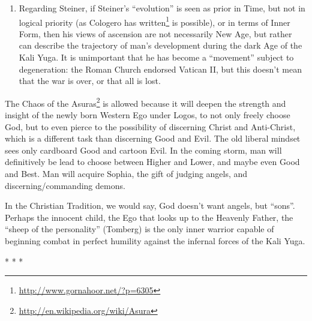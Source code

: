 \begin{enumerate}
\item Regarding Steiner, if Steiner's ``evolution'' is seen as prior in Time, but not in logical priority (as Cologero has written\footnote{\url{http://www.gornahoor.net/?p=6305}} is possible), or in terms of Inner Form, then his views of ascension are not necessarily New Age, but rather can describe the trajectory of man's development during the dark Age of the Kali Yuga. It is unimportant that he has become a ``movement'' subject to degeneration: the Roman Church endorsed Vatican II, but this doesn't mean that the war is over, or that all is lost.
\end{enumerate}

The Chaos of the Asuras\footnote{\url{http://en.wikipedia.org/wiki/Asura}} is allowed because it will deepen the strength and insight of the newly born Western Ego under Logos, to not only freely choose God, but to even pierce to the possibility of discerning Christ and Anti-Christ, which is a different task than discerning Good and Evil. The old liberal mindset sees only cardboard Good and cartoon Evil. In the coming storm, man will definitively be lead to choose between Higher and Lower, and maybe even Good and Best. Man will acquire Sophia, the gift of judging angels, and discerning/commanding demons.

In the Christian Tradition, we would say, God doesn't want angels, but ``sons''. Perhaps the innocent child, the Ego that looks up to the Heavenly Father, the ``sheep of the personality'' (Tomberg) is the only inner warrior capable of beginning combat in perfect humility against the infernal forces of the Kali Yuga.



\begin{center}* * *\end{center}


